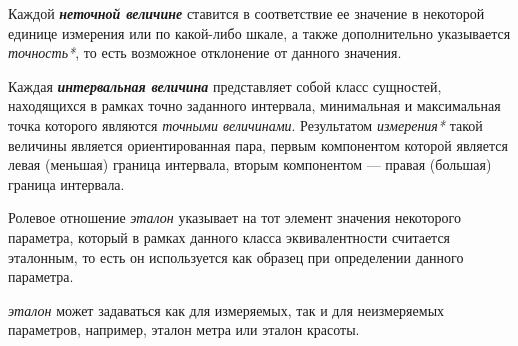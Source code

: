\begin{SCn}
\end{SCn}

Каждой \textbf{\textit{неточной величине}} ставится в соответствие ее значение в некоторой единице измерения или по какой-либо шкале, а также дополнительно указывается \textit{точность*}, то есть возможное отклонение от данного значения.

\begin{SCn}
\end{SCn}

Каждая \textbf{\textit{интервальная величина}} представляет собой класс сущностей, находящихся в рамках точно заданного интервала, минимальная и максимальная точка которого являются \textit{точными величинами}. Результатом \textit{измерения*} такой величины является ориентированная пара, первым компонентом которой является левая (меньшая) граница интервала, вторым компонентом --- правая (большая) граница интервала.

\begin{SCn}
\end{SCn}

\begin{SCn}
Ролевое отношение \textit{эталон\scnrolesign} указывает на тот элемент значения некоторого параметра, который в рамках данного класса эквивалентности считается эталонным, то есть он используется как образец при определении данного параметра.
\end{SCn}
		
\begin{SCn}
\textit{эталон\scnrolesign} может задаваться как для измеряемых, так и для неизмеряемых параметров, например, эталон метра или эталон красоты.
\end{SCn}
	
\begin{SCn}
\end{SCn}

